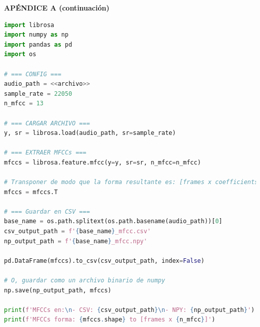 \documentclass[12pt]{report}
\begin{document}
\pagebreak
\begin{center}
\large\textbf{APÉNDICE A (continuación)}
\end{center}

\begin{lstlisting}[language=Python, caption={Prueba para extracción de características.}, label={lst:test_mfcc}]
import librosa
import numpy as np
import pandas as pd
import os

# === CONFIG ===
audio_path = <<archivo>>
sample_rate = 22050
n_mfcc = 13

# === CARGAR ARCHIVO ===
y, sr = librosa.load(audio_path, sr=sample_rate)

# === EXTRAER MFCCs ===
mfccs = librosa.feature.mfcc(y=y, sr=sr, n_mfcc=n_mfcc)

# Transponer de modo que la forma resultante es: [frames x coefficients]
mfccs = mfccs.T

# === Guardar en CSV ===
base_name = os.path.splitext(os.path.basename(audio_path))[0]
csv_output_path = f'{base_name}_mfcc.csv'
np_output_path = f'{base_name}_mfcc.npy'

pd.DataFrame(mfccs).to_csv(csv_output_path, index=False)

# O, guardar como un archivo binario de numpy
np.save(np_output_path, mfccs)

print(f'MFCCs en:\n- CSV: {csv_output_path}\n- NPY: {np_output_path}')
print(f'MFCCs forma: {mfccs.shape} to [frames x {n_mfcc}]')
\end{lstlisting}
\end{document}
